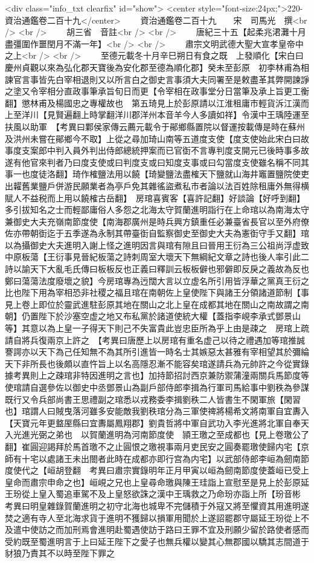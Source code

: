 <div class="info_txt clearfix" id="show">
<center style="font-size:24px;">220-資治通鑑卷二百十九</center>
  　　資治通鑑卷二百十九　　宋　司馬光　撰<br />
<br />
　　胡三省　音註<br />
<br />
　　唐紀三十五【起柔兆涒灘十月盡彊圍作噩閏月不滿一年】<br />
<br />
　　肅宗文明武德大聖大宣孝皇帝中之上<br />
<br />
　　至德元載冬十月辛巳朔日有食之既　上發順化【宋白曰慶州貞觀以來為弘化郡天寶後為安化郡至德為順化郡】癸未至彭原　初李林甫為相諫官言事皆先白宰相退則又以所言白之御史言事須大夫同署至是敕盡革其弊開諫諍之塗又令宰相分直政事筆承旨旬日而更【令宰相在政事堂分日當筆及承上旨更工衡翻】懲林甫及楊國忠之專權故也　第五琦見上於彭原請以江淮租庸市輕貨泝江漢而上至洋川【見賢遍翻上時掌翻洋川郡洋州本音羊今人多讀如祥】令漢中王瑀陸運至扶風以助軍　【考異曰鄴侯家傳云薦元載令于鄖鄉縣置院以督運按載傳是時在蘇州及洪州未嘗在鄖鄉今不取】上從之尋加琦山南等五道度支使【度支使始此宋白曰故事度支案郎中判入員外判出侍郎總統押案而已官衘不言專判度支開元已後時事多故遂有他官來判者乃曰度支使或曰判度支或曰知度支事或曰勾當度支使雖名稱不同其事一也度徒洛翻】琦作榷鹽法用以饒【琦變鹽法盡榷天下鹽就山海井竈置鹽院使吏出糶舊業鹽戶併游民願業者為亭戶免其雜徭盜煮私市者論以法百姓除租庸外無得横賦人不益税而上用以饒榷古岳翻】　房琯喜賓客【喜許記翻】好談論【好呼到翻】多引拔知名之士而輕鄙庸俗人多怨之北海太守賀蘭進明詣行在上命琯以為南海太守兼御史大夫充嶺南節度使【南海郡廣州是時兵興方鎮重任必兼臺省長官以至外府僚佐亦帶朝衘迄于五季遂為永制其帶臺衘自監察御史至御史大夫為憲衘守手又翻】琯以為攝御史大夫進明入謝上怪之進明因言與琯有隙且曰晉用王衍為三公祖尚浮虚致中原板蕩【王衍事見晉紀板蕩之詩刺周室大壞天下無綱紀文章之詩也後人率引此二詩以諭天下大亂毛氏傳曰板板反也正義曰釋訓云板板僻也邪僻即反戾之義故為反也鄭曰蕩蕩法度廢壞之貌】今房琯專為迃闊大言以立虚名所引用皆浮華之黨真王衍之比也陛下用為宰相恐非社稷之福且琯在南朝佐上皇使陛下與諸王分領諸道節制【事見上卷上即位於靈武進駐彭原其地在關山之北上皇在成都其地在關山之南故謂之南朝】仍置陛下於沙塞空虚之地又布私黨於諸道使統大權【蓋指李峴李承式鄧景山等】其意以為上皇一子得天下則己不失富貴此豈忠臣所為乎上由是疎之　房琯上疏請自將兵復兩京上許之　【考異曰唐歷上以房琯有重名虚己以待之禮遇加等琯推誠謇諤亦以天下為己任知無不為其所引進皆一時名士其嫉惡太甚雅有宰相望其於彌綸天下非所長也後頗以直忤旨上以名高隱忍漸不能容矣琯遂請兵為元帥許之今從實錄據考異則上之疎琯非特因進明之言也】加持節招討西京兼防禦蒲潼兩關兵馬節度等使琯請自選參佐以御史中丞鄧景山為副戶部侍郎李揖為行軍司馬給事中劉秩為參謀既行又令兵部尚書王思禮副之琯悉以戎務委李揖劉秩二人皆書生不閑軍旅【閑習也】琯謂人曰賊曳落河雖多安能敵我劉秩琯分為三軍使禆將楊希文將南軍自宜夀入【天寶元年更盩厔縣曰宜夀屬鳳翔郡】劉貴哲將中軍自武功入李光進將北軍自奉天入光進光弼之弟也　以賀蘭進明為河南節度使　頴王璬之至成都也【見上卷璬公了翻】崔圓迎謁拜於馬首璬不之止圓恨之璬視事兩月吏民安之圓奏罷璬使歸内宅【京師有十宅以處諸王未出閤者此時在成都亦即行宫為内宅】以武部侍郎李峘為劒南節度使代之【峘胡登翻　考異曰肅宗實錄明年正月甲寅以峘為劒南節度使蓋峘已受上皇命而肅宗申命之也】峘峴之兄也上皇尋命璬與陳王珪詣上宣慰至是見上於彭原延王玢從上皇入蜀追車駕不及上皇怒欲誅之漢中王瑀救之乃命玢亦詣上所【玢音彬　考異曰明皇雜錄賀蘭進明之初守北海也城卑不完儲積于外寇又將至懼資其用進明遂焚之適有寺人至北海求貨于進明不獲歸以損軍用聞於上遂詔罷郡守屬延王玢從上不及遣中使訪之而加刑焉會進明赴蜀遇使訪于路曰王罪不宜及刑願少留於路使者感而受約既至蜀進明言于上曰延王陛下之愛子也無兵權以變其心無郡國以驕其志間道于豺狼乃責其不以時至陛下罪之